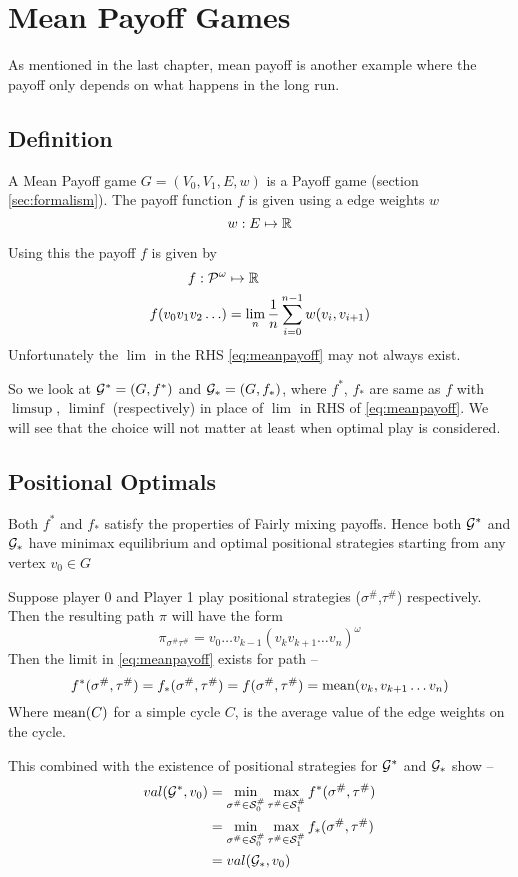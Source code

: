 \chapter{Mean Payoff Games}

As mentioned in the last chapter, mean payoff is another example where the payoff only depends on what happens in the long run.

\section{Definition}
A Mean Payoff game $G=(V_0,V_1,E,w)$ is a Payoff game (section \ref{sec:formalism}). The payoff function $f$ is given using a edge weights $w$
\[
    w : E \mapsto \mathbb{R}
\]

Using this the payoff $f$ is given by
\begin{align}
    f : \mathcal{P}^\omega &\mapsto \mathbb{R} \\
    f (v_0v_1v_2 \ldots) &= \lim_n \frac{1}{n} \sum_{i=0}^{n-1} w(v_i,v_{i+1}) \label{eq:meanpayoff}
\end{align}
Unfortunately the $\lim$ in the RHS \eqref{eq:meanpayoff} may not always exist.

So we look at $\mathcal{G}^*=(G,f^*)$ and $\mathcal{G}_*=(G,f_*)$, where $f^*$, $f_*$ are same as $f$ with $\limsup$, $\liminf$ (respectively) in place of $\lim$ in RHS of \eqref{eq:meanpayoff}.
We will see that the choice will not matter at least when optimal play is considered.

\section{Positional Optimals}
Both $f^*$ and $f_*$ satisfy the properties of Fairly mixing payoffs. Hence both $\mathcal{G}^*$ and $\mathcal{G}_*$ have minimax equilibrium and optimal positional strategies starting from any vertex $v_0 \in G$

Suppose player 0 and Player 1 play positional strategies ($\sigma^\#$,$\tau^\#$) respectively. Then the resulting path $\pi$ will have the form 
\[
    \pi_{\sigma^\# \tau^\#} = v_0\ldots v_{k-1} (v_k v_{k+1} \ldots v_{n})^\omega
\]
Then the limit in \eqref{eq:meanpayoff} exists for path --
\[
    f^*(\sigma^\#, \tau^\#) = f_*(\sigma^\#,\tau^\#) = f(\sigma^\#, \tau^\#) = \operatorname*{mean}(v_k,v_{k+1} \ldots v_{n}) 
\]
Where $\operatorname*{mean}(C)$ for a simple cycle $C$, is the average value of the edge weights on the cycle.

This combined with the existence of positional strategies for $\mathcal{G}^*$ and $\mathcal{G}_*$ show --
\begin{align}
    val(\mathcal{G}^*,v_0) &= \min_{\sigma^\# \in \mathcal{S}^\#_0} \max_{\tau^\# \in \mathcal{S}^\#_1} f^*(\sigma^\#, \tau^\#)\\
    &= \min_{\sigma^\# \in \mathcal{S}^\#_0} \max_{\tau^\# \in \mathcal{S}^\#_1} f_*(\sigma^\#, \tau^\#)\\
    &= val(\mathcal{G}_*, v_0)
\end{align}

